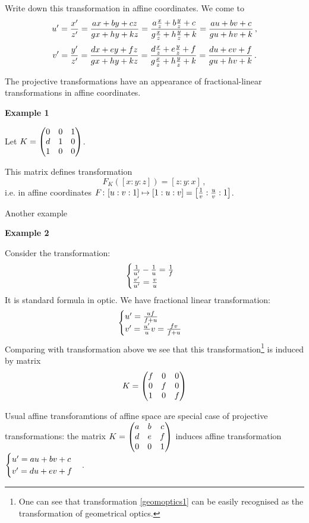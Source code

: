 \documentclass[12pt]{article}
\numberwithin{equation}{section}
\begin{document}
 {\footnotesize  Write down this transformation in affine coordinates.
We come to
       \begin{equation*}
u'={x'\over z'}=
{ax+by+cz\over gx+hy+kz}=
{a{x\over z}+b{y\over z}+c\over g{x\over z}+h{y\over z}+k}=
{au+bv+c\over gu+hv+k}\,,
          \end{equation*}
       \begin{equation*}
v'={y'\over z'}=
{dx+ey+fz\over gx+hy+kz}=
{d{x\over z}+e{y\over z}+f\over g{x\over z}+h{y\over z}+k}=
{du+ev+f\over gu+hv+k}\,.
          \end{equation*}

The projective transformations have an appearance of
 fractional-linear transformations
in affine coordinates.

\m

{\bf Example 1}

 Let $
K=\begin{pmatrix} 
  0 &0 & 1\cr
  d &1 & 0\cr
  1 &0 & 0\cr
      \end{pmatrix}
    $.

This matrix defines transformation
           $$
             F_K([x:y:z])=[z:y:x]\,,
            $$
i.e. in affine coordinates
$F\colon [u:v:1]\mapsto [1:u:v]=\left[{1\over v}:{u\over v}:1\right]$.

    Another example

\m

{\bf Example 2}

 Consider the transformation:
            \begin{equation}\label{geomoptics1}
                  \begin{cases}
          {1\over u'}-{1\over u}={1\over f}\cr
              {v'\over u'}={v\over u}\cr
                   \end{cases}
           \end{equation}
It is standard formula in optic. We have
 fractional linear transformation:
                         $$
                      \begin{cases}
                    u'={uf\over f+u}\cr
         v'={u'\over u}v={fv\over f+u}\cr
                              \end{cases}
                      $$
Comparing with transformation above we see that 
this transformation\footnote{One can see that transformation
\eqref{geomoptics1}
can be easily recognised as the transformation of 
geometrical optics.}  is  induced by matrix
                    $$
  K=\begin{pmatrix} 
  f &0 & 0\cr
  0 &f & 0\cr
  1 &0 & f\cr
      \end{pmatrix}
          $$


  Usual affine transforamtions of affine space are special case
of projective transformations: the matrix
 $
  K=\begin{pmatrix} 
  a &b & c\cr
  d &e & f\cr
  0 &0 & 1\cr
      \end{pmatrix}
          $  induces affine transformation
 $\begin{cases}
   u'=au+bv+c\cr
   v'=du+ev+f\cr
        \end{cases}$.
}
\end{document}
